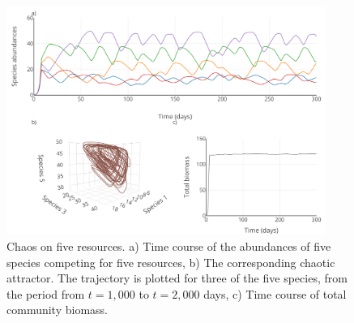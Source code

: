 \begin{figure}[H]
\begin{center} 
 \includegraphics[width=0.93\textwidth]{../Code/Figures/Figure_2.pdf}
  \caption{Chaos on five resources. a) Time course of the abundances of five species competing for five resources, b) The corresponding chaotic attractor. The trajectory is plotted for three of the five species, from the period from $t= 1,000$ to $t=2,000$ days, c) Time course of total community biomass.}
  \label{figures:Fig2}
\end{center}
\end{figure}

